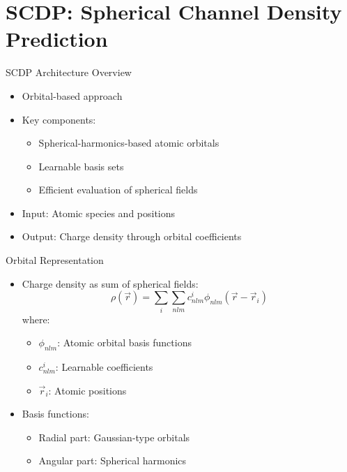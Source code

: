 \section{SCDP: Spherical Channel Density Prediction}

\begin{frame}{SCDP Architecture Overview}
    \begin{itemize}
        \item Orbital-based approach
        \item Key components:
        \begin{itemize}
            \item Spherical-harmonics-based atomic orbitals
            \item Learnable basis sets
            \item Efficient evaluation of spherical fields
        \end{itemize}
        \item Input: Atomic species and positions
        \item Output: Charge density through orbital coefficients
    \end{itemize}
\end{frame}

\begin{frame}{Orbital Representation}
    \begin{itemize}
        \item Charge density as sum of spherical fields:
        \[
        \rho(\vec{r}) = \sum_i \sum_{nlm} c_{nlm}^i \phi_{nlm}(\vec{r} - \vec{r}_i)
        \]
        where:
        \begin{itemize}
            \item $\phi_{nlm}$: Atomic orbital basis functions
            \item $c_{nlm}^i$: Learnable coefficients
            \item $\vec{r}_i$: Atomic positions
        \end{itemize}
        \item Basis functions:
        \begin{itemize}
            \item Radial part: Gaussian-type orbitals
            \item Angular part: Spherical harmonics
        \end{itemize}
    \end{itemize}
\end{frame}

